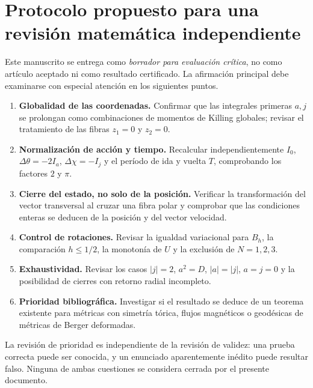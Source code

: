 \documentclass[11pt,a4paper]{article}
\theoremstyle{remark}\newtheorem{remark}[theorem]{Observación}
\begin{document}
\section{Protocolo propuesto para una revisión matemática independiente}
Este manuscrito se entrega como \emph{borrador para evaluación crítica}, no como artículo aceptado ni como resultado certificado. La afirmación principal debe examinarse con especial atención en los siguientes puntos.
\begin{enumerate}[label=\arabic*.]
\item \textbf{Globalidad de las coordenadas.} Confirmar que las integrales primeras $a,j$ se prolongan como combinaciones de momentos de Killing globales; revisar el tratamiento de las fibras $z_1=0$ y $z_2=0$.
\item \textbf{Normalización de acción y tiempo.} Recalcular independientemente $I_0$, $\Delta\theta=-2I_a$, $\Delta\chi=-I_j$ y el período de ida y vuelta $T$, comprobando los factores $2$ y $\pi$.
\item \textbf{Cierre del estado, no solo de la posición.} Verificar la transformación del vector transversal al cruzar una fibra polar y comprobar que las condiciones enteras se deducen de la posición y del vector velocidad.
\item \textbf{Control de rotaciones.} Revisar la igualdad variacional para $B_h$, la comparación $h\le1/2$, la monotonía de $U$ y la exclusión de $N=1,2,3$.
\item \textbf{Exhaustividad.} Revisar los casos $|j|=2$, $a^2=D$, $|a|=|j|$, $a=j=0$ y la posibilidad de cierres con retorno radial incompleto.
\item \textbf{Prioridad bibliográfica.} Investigar si el resultado se deduce de un teorema existente para métricas con simetría tórica, flujos magnéticos o geodésicas de métricas de Berger deformadas.
\end{enumerate}
La revisión de prioridad es independiente de la revisión de validez: una prueba correcta puede ser conocida, y un enunciado aparentemente inédito puede resultar falso. Ninguna de ambas cuestiones se considera cerrada por el presente documento.
\end{document}
